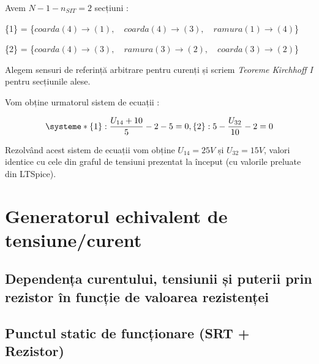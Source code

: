 \documentclass[12pt,twoside]{article}
\begin{document}
Avem $N - 1 - n_{SIT} = 2$ secțiuni :

\vspace{10px}
\{1\} = \{$coarda (4) \rightarrow (1),\quad coarda (4) \rightarrow (3) ,\quad ramura (1) \rightarrow (4)$\}

\{2\} = \{$coarda (4) \rightarrow (3) ,\quad ramura (3) \rightarrow (2) , \quad coarda (3) \rightarrow (2)$\}

\vspace{10px}
\begin{flushleft}
Alegem sensuri de referință arbitrare pentru curenți și scriem \textit{Teoreme Kirchhoff I} pentru secțiunile alese.
\end{flushleft} 

Vom obține urmatorul sistem de ecuații :

\begin{equation}
\systeme*{
\{1\}: \frac{U_{14} + 10}{5} - 2 - 5 = 0,
\{2\}: 5 - \frac{U_{32}}{10} - 2 = 0
}
\end{equation}

\vspace{10px}
Rezolvând acest sistem de ecuații vom obține $U_{14}=25V$ și $U_{32}=15V$, valori identice cu cele din graful de tensiuni prezentat la început (cu valorile preluate din LTSpice).  

\newpage
\section{Generatorul echivalent de tensiune/curent}
\paragraph{}

\subsection{Dependența curentului, tensiunii și puterii prin rezistor
în funcție de valoarea rezistenței}
\paragraph{}

\subsection{Punctul static de funcționare (SRT + Rezistor)}
\paragraph{}
\end{document}
